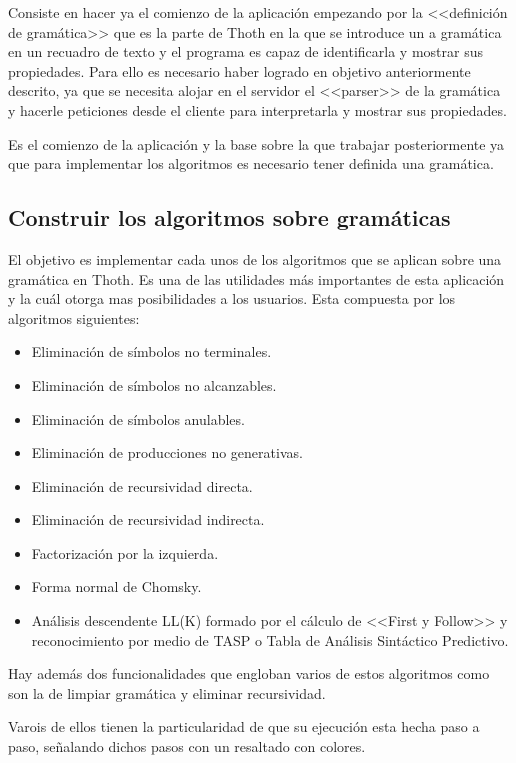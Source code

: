 Consiste en hacer ya el comienzo de la aplicación empezando por la <<definición de gramática>> que es la parte de Thoth en la que se introduce un a gramática en un recuadro de texto y el programa es capaz de identificarla y mostrar sus propiedades. Para ello es necesario haber logrado en objetivo anteriormente descrito, ya que se necesita alojar en el servidor el <<parser>> de la gramática y hacerle peticiones desde el cliente para interpretarla y mostrar sus propiedades.

Es el comienzo de la aplicación y la base sobre la que trabajar posteriormente ya que para implementar los algoritmos es necesario tener definida una gramática.

\subsection{Construir los algoritmos sobre gramáticas}

El objetivo es implementar cada unos de los algoritmos que se aplican sobre una gramática en Thoth. Es una de las utilidades más importantes de esta aplicación y la cuál otorga mas posibilidades a los usuarios. Esta compuesta por los algoritmos siguientes:

\begin{itemize}
\item Eliminación de símbolos no terminales.
\item Eliminación de símbolos no alcanzables. 
\item Eliminación de símbolos anulables.
\item Eliminación de producciones no generativas.
\item Eliminación de recursividad directa.
\item Eliminación de recursividad indirecta.
\item Factorización por la izquierda.
\item Forma normal de Chomsky.
\item Análisis descendente LL(K) formado por el cálculo de <<First y Follow>> y reconocimiento por medio de TASP o Tabla de Análisis Sintáctico Predictivo.
\end{itemize}

Hay además dos funcionalidades que engloban varios de estos algoritmos como son la de limpiar gramática y eliminar recursividad.

Varois de ellos tienen la particularidad de que su ejecución esta hecha paso a paso, señalando dichos pasos con un resaltado con colores.

